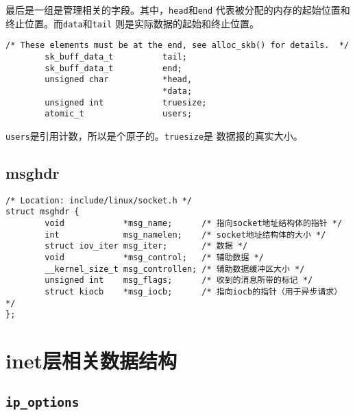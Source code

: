 最后是一组是管理相关的字段。其中，\texttt{head}和\texttt{end}
代表被分配的内存的起始位置和终止位置。而\texttt{data}和\texttt{tail}
则是实际数据的起始和终止位置。
\begin{verbatim}
/* These elements must be at the end, see alloc_skb() for details.  */
        sk_buff_data_t          tail;
        sk_buff_data_t          end;
        unsigned char           *head,
                                *data;
        unsigned int            truesize;
        atomic_t                users;
\end{verbatim}
\texttt{users}是引用计数，所以是个原子的。\texttt{truesize}是
数据报的真实大小。

\subsection{msghdr}
\begin{verbatim}
/* Location: include/linux/socket.h */
struct msghdr {
        void            *msg_name;      /* 指向socket地址结构体的指针 */
        int             msg_namelen;    /* socket地址结构体的大小 */
        struct iov_iter msg_iter;       /* 数据 */
        void            *msg_control;   /* 辅助数据 */
        __kernel_size_t msg_controllen; /* 辅助数据缓冲区大小 */
        unsigned int    msg_flags;      /* 收到的消息所带的标记 */
        struct kiocb    *msg_iocb;      /* 指向iocb的指针（用于异步请求） */
};
\end{verbatim}

    \section{inet层相关数据结构}
        \subsection{\texttt{ip_options}}

